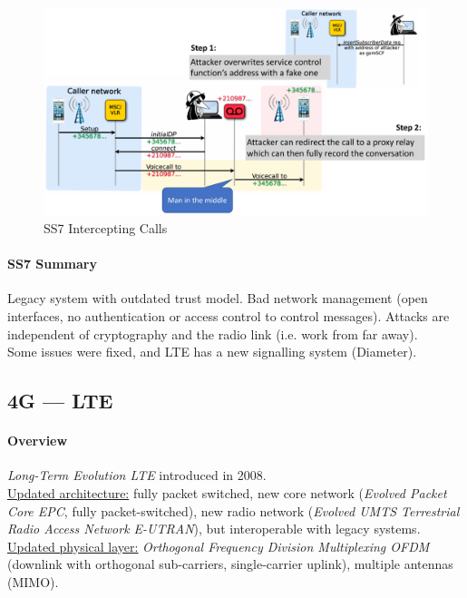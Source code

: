 \begin{figure}[h]
	\centering
	\includegraphics[scale=0.4]{images/10-ss7-calls.png}
	\caption{SS7 Intercepting Calls}
	\label{fig:ss7-calls}
\end{figure}

\paragraph{SS7 Summary}
Legacy system with outdated trust model. Bad network management (open
interfaces, no authentication or access control to control messages). Attacks
are independent of cryptography and the radio link (i.e. work from far away).
\\ Some issues were fixed, and LTE has a new signalling system (Diameter).

\subsection{4G  --- LTE}

\paragraph{Overview}
\textit{Long-Term Evolution LTE} introduced in 2008.
\\
\underline{Updated architecture:}
fully packet switched, new core network (\textit{Evolved Packet Core EPC}, fully packet-switched), new radio network (\textit{Evolved UMTS Terrestrial Radio Access Network E-UTRAN}), but interoperable with legacy systems.
\\
\underline{Updated physical layer:}
\textit{Orthogonal Frequency Division Multiplexing OFDM} (downlink with orthogonal sub-carriers, single-carrier uplink), multiple antennas (MIMO).

